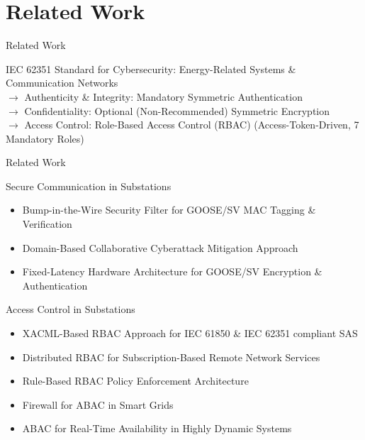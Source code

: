 \documentclass[en]{sdqbeamer}
\begin{document}
\section{Related Work}
\begin{frame}{Related Work}
    \begin{blueblock}{IEC 62351 \parencite*{IEC62351P6,IEC62351P8}}
        Standard for Cybersecurity: Energy-Related Systems \& Communication Networks
        \\$\rightarrow$ Authenticity \& Integrity: Mandatory Symmetric Authentication
        \\$\rightarrow$ Confidentiality: Optional (Non-Recommended) Symmetric Encryption
        \\$\rightarrow$ Access Control: Role-Based Access Control (RBAC) (Access-Token-Driven, 7 Mandatory Roles)
    \end{blueblock}
\end{frame}
\begin{frame}{Related Work}
    \begin{blueblock}{Secure Communication in Substations}
        \begin{itemize}
            \item Bump-in-the-Wire Security Filter for GOOSE/SV MAC Tagging \& Verification \parencite{Ishchenko2018}
            \item Domain-Based Collaborative Cyberattack Mitigation Approach \parencite{Hong2019}
            \item Fixed-Latency Hardware Architecture for GOOSE/SV Encryption \& Authentication \parencite{Rodriguez2021}
        \end{itemize}
    \end{blueblock}

    \begin{blueblock}{Access Control in Substations}
        \begin{itemize}
            \item XACML-Based RBAC Approach for IEC 61850 \& IEC 62351 compliant SAS \parencite{Lee2015}
            \item Distributed RBAC for Subscription-Based Remote Network Services \parencite{Ma2006} %
            \item Rule-Based RBAC Policy Enforcement Architecture \parencite{Alcaraz2016} %
            \item Firewall for ABAC in Smart Grids \parencite{Ruland2018}
            \item ABAC for Real-Time Availability in Highly Dynamic Systems \parencite{Burmester2013}
        \end{itemize}
    \end{blueblock}
\end{frame}
\end{document}

